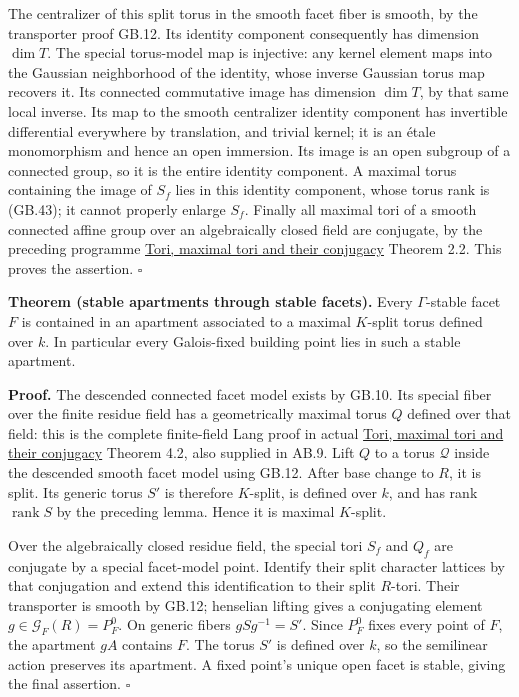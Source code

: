 \documentclass[
  11pt,
]{article}
\begin{document}
The centralizer of this split torus in the smooth facet fiber is smooth,
by the transporter proof GB.12. Its identity component consequently has
dimension \(\dim T\). The special torus-model map is injective: any
kernel element maps into the Gaussian neighborhood of the identity,
whose inverse Gaussian torus map recovers it. Its connected commutative
image has dimension \(\dim T\), by that same local inverse. Its map to
the smooth centralizer identity component has invertible differential
everywhere by translation, and trivial kernel; it is an étale
monomorphism and hence an open immersion. Its image is an open subgroup
of a connected group, so it is the entire identity component. A maximal
torus containing the image of \(S_f\) lies in this identity component,
whose torus rank is (GB.43); it cannot properly enlarge \(S_f\). Finally
all maximal tori of a smooth connected affine group over an
algebraically closed field are conjugate, by the preceding programme
\href{../AG-RG/AG-RG-01.html}{Tori, maximal tori and their conjugacy}
Theorem 2.2. This proves the assertion. \(\square\)

\textbf{Theorem (stable apartments through stable facets).} Every
\(\Gamma\)-stable facet \(F\) is contained in an apartment associated to
a maximal \(K\)-split torus defined over \(k\). In particular every
Galois-fixed building point lies in such a stable apartment.

\textbf{Proof.} The descended connected facet model exists by GB.10. Its
special fiber over the finite residue field has a geometrically maximal
torus \(Q\) defined over that field: this is the complete finite-field
Lang proof in actual \href{../AG-RG/AG-RG-01.html}{Tori, maximal tori
and their conjugacy} Theorem 4.2, also supplied in AB.9. Lift \(Q\) to a
torus \(\mathcal Q\) inside the descended smooth facet model using
GB.12. After base change to \(R\), it is split. Its generic torus \(S'\)
is therefore \(K\)-split, is defined over \(k\), and has rank
\(\operatorname {rank}S\) by the preceding lemma. Hence it is maximal
\(K\)-split.

Over the algebraically closed residue field, the special tori \(S_f\)
and \(Q_f\) are conjugate by a special facet-model point. Identify their
split character lattices by that conjugation and extend this
identification to their split \(R\)-tori. Their transporter is smooth by
GB.12; henselian lifting gives a conjugating element
\(g\in\mathcal G_F(R)=P_F^0\). On generic fibers \(gSg^{-1}=S'\). Since
\(P_F^0\) fixes every point of \(F\), the apartment \(gA\) contains
\(F\). The torus \(S'\) is defined over \(k\), so the semilinear action
preserves its apartment. A fixed point's unique open facet is stable,
giving the final assertion. \(\square\)
\end{document}
